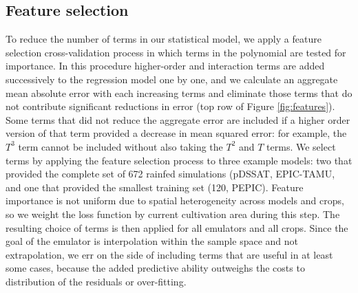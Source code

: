 \documentclass[gmd, manuscript]{copernicus} %
\begin{document}
\subsection{Feature selection}
To reduce the number of terms in our statistical model, we apply a feature selection cross-validation process in which terms in the polynomial are tested for importance.
In this procedure higher-order and interaction terms are added successively to the regression model one by one, and 
we calculate an aggregate mean absolute error with each increasing terms and eliminate those terms that do not contribute significant reductions in error (top row of Figure \ref{fig:features}). 
Some terms that did not reduce the aggregate error are included if a higher order version of that term provided a decrease in mean squared error: for example, the $T^3$ term cannot be included without also taking the $T^2$ and $T$ terms. 
We select terms by applying the feature selection process to three example models: two that provided the complete set of 672 rainfed simulations (pDSSAT, EPIC-TAMU, and one that provided the smallest training set (120, PEPIC). 
Feature importance is not uniform due to spatial heterogeneity across models and crops, so we weight the loss function by current cultivation area \citep{Portmann2010} during this step. 
The resulting choice of terms is then applied for all emulators and all crops. 
Since the goal of the emulator is interpolation within the sample space and not extrapolation, we err on the side of including terms that are useful in at least some cases, because the added predictive ability outweighs the costs to distribution of the residuals or over-fitting.  
\end{document}
